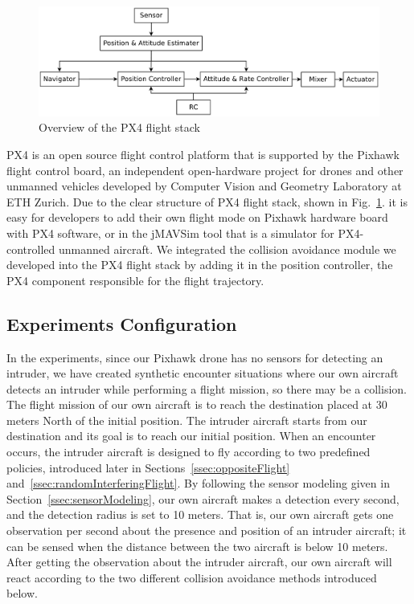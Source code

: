 \documentclass[orivec]{llncs}
\newcommand{\jMAVSim}{\textsf{jMAVSim}}
\begin{document}
\begin{figure}[t]
	\centering
	\includegraphics[width=0.9\linewidth]{flightStack.pdf}
	\caption{Overview of the PX4 flight stack}
	\label{fig:flightStack}
\end{figure}

PX4 is an open source flight control platform that is supported by the Pixhawk flight control board, an independent open-hardware project for drones and other unmanned vehicles developed by Computer Vision and Geometry Laboratory at ETH Zurich.
Due to the clear structure of PX4 flight stack, shown in Fig.~\ref{fig:flightStack}. it is easy for developers to add their own flight mode on Pixhawk hardware board with PX4 software, or in the \jMAVSim{} tool that is a simulator for PX4-controlled unmanned aircraft.
We integrated the collision avoidance module we developed into the PX4 flight stack by adding it in the  position controller, the PX4 component responsible for the flight trajectory.


\subsection{Experiments Configuration}
\label{ssec:experimentsConfiguration}

In the experiments, since our Pixhawk drone has no sensors for detecting an intruder, we have created synthetic encounter situations where our own aircraft detects an intruder while performing a flight mission, so there may be a collision. 
The flight mission of our own aircraft is to reach the destination placed at 30 meters North of the initial position. 
The intruder aircraft starts from our destination and its goal is to reach our initial position.
When an encounter occurs, the intruder aircraft is designed to fly according to two predefined policies, introduced later in Sections~\ref{ssec:oppositeFlight} and~\ref{ssec:randomInterferingFlight}.
By following the sensor modeling given in Section~\ref{ssec:sensorModeling}, our own aircraft makes a detection every second, and the detection radius is set to 10 meters. 
That is, our own aircraft gets one observation per second about the presence and position of an intruder aircraft; 
it can be sensed when the distance between the two aircraft is below 10 meters. 
After getting the observation about the intruder aircraft, our own aircraft will react according to the two different collision avoidance methods introduced below.
\end{document}
